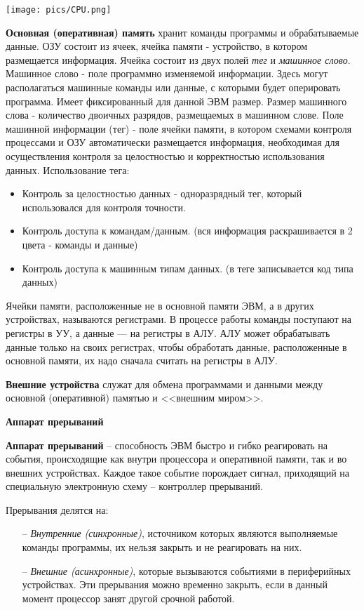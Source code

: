 \texttt{[image: pics/CPU.png]}

\textbf{Основная (оперативная) память} хранит команды программы и обрабатываемые данные. ОЗУ состоит из ячеек, ячейка памяти - устройство, в котором размещается информация. Ячейка состоит из двух полей \textit{тег} и \textit{машинное слово}. Машинное слово - поле программно изменяемой информации. Здесь могут располагаться машинные команды или данные, с которыми будет оперировать программа. Имеет фиксированный для данной ЭВМ размер. Размер машинного слова - количество двоичных разрядов, размещаемых в машинном слове. Поле машинной информации (тег) - поле ячейки памяти, в котором схемами контроля процессами и ОЗУ автоматически размещается информация, необходимая для осуществления контроля за целостностью и корректностью использования данных. Использование тега:
\begin{itemize}
    \item Контроль за целостностью данных - одноразрядный тег, который использовался для контроля точности.
    \item Контроль доступа к командам/данным. (вся информация раскрашивается в 2 цвета - команды и данные)
    \item Контроль доступа к машинным типам данных. (в теге записывается код типа данных)
\end{itemize}

Ячейки памяти, расположенные не в основной памяти ЭВМ, а в других устройствах, называются регистрами. В процессе работы команды поступают на регистры в УУ, а данные --- на регистры в АЛУ. АЛУ может обрабатывать данные только на своих регистрах, чтобы обработать данные, расположенные в основной памяти, их надо сначала считать на регистры в АЛУ.

\textbf{Внешние устройства} служат для обмена программами и данными между основной (оперативной) памятью и <<внешним миром>>.


\centerline{\textbf{Аппарат прерываний}}

\textbf{Аппарат прерываний} -- способность ЭВМ быстро и гибко реагировать на события, происходящие как внутри процессора и оперативной памяти, так и во внешних устройствах. Каждое такое событие порождает сигнал, приходящий на специальную электронную схему -- контроллер прерываний.

Прерывания делятся на:
\begin{itemize}
    \item[--] \textit{Внутренние (синхронные)}, источником которых являются выполняемые команды программы, их нельзя закрыть и не реагировать на них.
    \item[--] \textit{Внешние (асинхронные)}, которые вызываются событиями в периферийных устройствах. Эти прерывания можно временно закрыть, если в данный момент процессор занят другой срочной работой.
\end{itemize}
    
